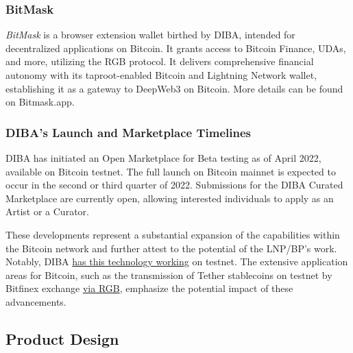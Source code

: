 \subsubsection{BitMask}
\textit{BitMask} is a browser extension wallet birthed by DIBA, intended for decentralized applications on Bitcoin. It grants access to Bitcoin Finance, UDAs, and more, utilizing the RGB protocol. It delivers comprehensive financial autonomy with its taproot-enabled Bitcoin and Lightning Network wallet, establishing it as a gateway to DeepWeb3 on Bitcoin. More details can be found on Bitmask.app.\par
\subsubsection{DIBA's Launch and Marketplace Timelines}
DIBA has initiated an Open Marketplace for Beta testing as of April 2022, available on Bitcoin testnet. The full launch on Bitcoin mainnet is expected to occur in the second or third quarter of 2022. Submissions for the DIBA Curated Marketplace are currently open, allowing interested individuals to apply as an Artist or a Curator.\par
These developments represent a substantial expansion of the capabilities within the Bitcoin network and further attest to the potential of the LNP/BP's work. Notably, DIBA \href{https://diba.io/}{has this technology working} on testnet. The extensive application areas for Bitcoin, such as the transmission of Tether stablecoins on testnet by Bitfinex exchange \href{https://github.com/RGB-Tools/rgb-lightning-sample}{via RGB}, emphasize the potential impact of these advancements.
\subsection{Product Design}
